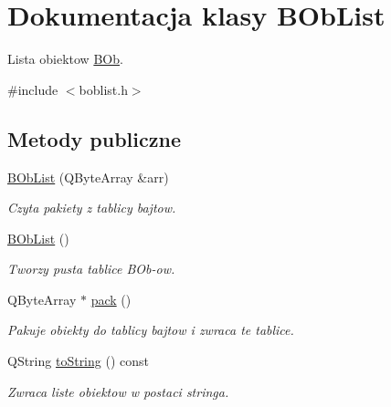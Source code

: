 \hypertarget{class_b_ob_list}{
\section{Dokumentacja klasy BObList}
\label{class_b_ob_list}
}


Lista obiektow \hyperlink{class_b_ob}{BOb}.  




{\ttfamily \#include $<$boblist.h$>$}

\subsection*{Metody publiczne}
\begin{DoxyCompactItemize}
\item 
\hyperlink{class_b_ob_list_af7a55be345796f510a836c0696513f6e}{BObList} (QByteArray \&arr)
\begin{DoxyCompactList}\small\item\em Czyta pakiety z tablicy bajtow. \item\end{DoxyCompactList}\item 
\hypertarget{class_b_ob_list_afcc5319572df6cf382c1fffb15b3d10c}{
\hyperlink{class_b_ob_list_afcc5319572df6cf382c1fffb15b3d10c}{BObList} ()}
\label{class_b_ob_list_afcc5319572df6cf382c1fffb15b3d10c}

\begin{DoxyCompactList}\small\item\em Tworzy pusta tablice BOb-\/ow. \item\end{DoxyCompactList}\item 
QByteArray $\ast$ \hyperlink{class_b_ob_list_adfa68bde6e6c3c6641735fb552a76d80}{pack} ()
\begin{DoxyCompactList}\small\item\em Pakuje obiekty do tablicy bajtow i zwraca te tablice. \item\end{DoxyCompactList}\item 
\hypertarget{class_b_ob_list_a273423dd42fb635bab24694b569bbe21}{
QString \hyperlink{class_b_ob_list_a273423dd42fb635bab24694b569bbe21}{toString} () const }
\label{class_b_ob_list_a273423dd42fb635bab24694b569bbe21}

\begin{DoxyCompactList}\small\item\em Zwraca liste obiektow w postaci stringa. \item\end{DoxyCompactList}\end{DoxyCompactItemize}


